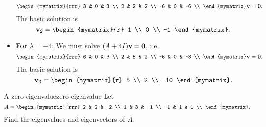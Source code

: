 \begin{solution}
\begin{itemize}
\begin{equation*}
\begin{mymatrix}{rrr}
        3  & 0 & 3 \\
        2  & 2 & 2 \\
        -6 & 0 & -6 \\
      \end{mymatrix}\vect{v}=\vect{0}.
    \end{equation*}
    The basic solution is
    \begin{equation*}
      \vect{v}_2 = \begin{mymatrix}{r} 1 \\ 0 \\ -1 \end{mymatrix}.
    \end{equation*}
  \item {\bf{\underline{For $\lambda=-4$:}}} We must solve
    $(A+4I)\mbox{\bf v}=\mbox{\bf 0}$, i.e.,
    \begin{equation*}
      \begin{mymatrix}{rrr}
        6  & 0 & 3 \\
        2  & 5 & 2 \\
        -6 & 0 & -3 \\
      \end{mymatrix}\vect{v}=\vect{0}.
    \end{equation*}
    The basic solution is
    \begin{equation*}
      \vect{v}_3 = \begin{mymatrix}{r} 5 \\ 2 \\ -10 \end{mymatrix}.
    \end{equation*}
  \end{itemize}
\end{solution}

\begin{example}{A zero eigenvalue}{zero-eigenvalue}
  Let
  \begin{equation*}
    A=\begin{mymatrix}{rrr}
      2 & 2 & -2 \\
      1 & 3 & -1 \\
      -1 & 1 & 1 \\
    \end{mymatrix}.
  \end{equation*}
  Find the eigenvalues and eigenvectors of $A$.
\end{example}

